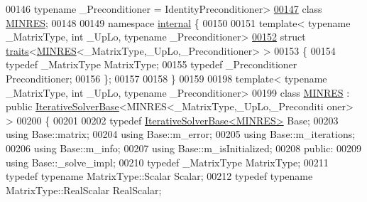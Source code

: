 \begin{DoxyCode}
00146     \textcolor{keyword}{typename} \_Preconditioner = IdentityPreconditioner>
\hyperlink{group___iterative_linear_solvers___module}{00147}     \textcolor{keyword}{class }\hyperlink{group___iterative_linear_solvers___module_class_eigen_1_1_m_i_n_r_e_s}{MINRES};
00148     
00149     \textcolor{keyword}{namespace }\hyperlink{namespaceinternal}{internal} \{
00150         
00151         \textcolor{keyword}{template}< \textcolor{keyword}{typename} \_MatrixType, \textcolor{keywordtype}{int} \_UpLo, \textcolor{keyword}{typename} \_Preconditioner>
\hyperlink{struct_eigen_1_1internal_1_1traits_3_01_m_i_n_r_e_s_3_01___matrix_type_00_01___up_lo_00_01___preconditioner_01_4_01_4}{00152}         \textcolor{keyword}{struct }\hyperlink{struct_eigen_1_1internal_1_1traits}{traits}<\hyperlink{group___iterative_linear_solvers___module_class_eigen_1_1_m_i_n_r_e_s}{MINRES}<\_MatrixType,\_UpLo,\_Preconditioner> >
00153         \{
00154             \textcolor{keyword}{typedef} \_MatrixType MatrixType;
00155             \textcolor{keyword}{typedef} \_Preconditioner Preconditioner;
00156         \};
00157         
00158     \}
00159     
00198     \textcolor{keyword}{template}< \textcolor{keyword}{typename} \_MatrixType, \textcolor{keywordtype}{int} \_UpLo, \textcolor{keyword}{typename} \_Preconditioner>
00199     \textcolor{keyword}{class }\hyperlink{group___iterative_linear_solvers___module_class_eigen_1_1_m_i_n_r_e_s}{MINRES} : \textcolor{keyword}{public} \hyperlink{group___iterative_linear_solvers___module_class_eigen_1_1_iterative_solver_base}{IterativeSolverBase}<MINRES<\_MatrixType,\_UpLo,\_Preconditi
      oner> >
00200     \{
00201         
00202         \textcolor{keyword}{typedef} \hyperlink{group___iterative_linear_solvers___module_class_eigen_1_1_iterative_solver_base}{IterativeSolverBase<MINRES>} Base;
00203         \textcolor{keyword}{using} Base::matrix;
00204         \textcolor{keyword}{using} Base::m\_error;
00205         \textcolor{keyword}{using} Base::m\_iterations;
00206         \textcolor{keyword}{using} Base::m\_info;
00207         \textcolor{keyword}{using} Base::m\_isInitialized;
00208     \textcolor{keyword}{public}:
00209         \textcolor{keyword}{using} Base::\_solve\_impl;
00210         \textcolor{keyword}{typedef} \_MatrixType MatrixType;
00211         \textcolor{keyword}{typedef} \textcolor{keyword}{typename} MatrixType::Scalar Scalar;
00212         \textcolor{keyword}{typedef} \textcolor{keyword}{typename} MatrixType::RealScalar RealScalar;

\end{DoxyCode}
